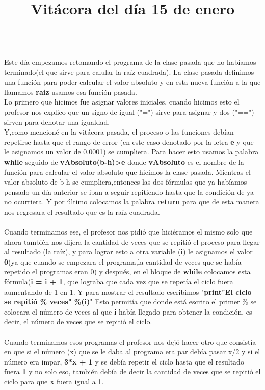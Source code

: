 \documentclass{article}
\begin{document}
	\title{\huge\textbf{Vitácora del día 15 de enero\\}} \\
	Este día empezamos retomando el programa de la clase pasada que no habíamos terminado(el que sirve para calular la raíz cuadrada). La clase pasada definimos una función para poder calcular el valor absoluto y en esta nueva función a la que llamamos \textbf{raiz} usamos esa función pasada. \\
	Lo primero que hicimos fue asignar valores iniciales, cuando hicimos esto el profesor nos explico que un signo de igual ("=") sirve para asignar y dos ("==") sirven para denotar una igualdad. \\
	Y,como mencioné en la vitácora pasada, el proceso o las funciones debían repetirse hasta que el rango de error (en este caso denotado por la letra \textbf{e} y que le asignamos un valor de 0.0001) se cumpliera. Para hacer esto usamos la palabra \textbf{while} seguido de \textbf{vAbsoluto(b-h)>e} donde \textbf{vAbsoluto} es el nombre de la función para calcular el valor absoluto que hicimos la clase pasada. Mientras el valor absoluto de b-h se cumpliera,entonces las dos fórmulas que ya habíamos pensado un día anterior se iban a seguir repitiendo hasta que la condición de ya no ocurriera. Y por último colocamos la palabra \textbf{return} para que de esta manera nos regresara el resultado que es la raíz cuadrada. \\ \\
	Cuando terminamos ese, el profesor nos pidió que hiciéramos el mismo solo que ahora también nos dijera la cantidad de veces que se repitió el proceso para llegar al resultado (la raíz), y para lograr esto a otra variable (\textbf{i}) le asignamos el valor \textbf{0}(ya que cuando se empezara el programa,la cantidad de veces que se había repetido el programas eran 0) y después, en el bloque de \textbf{while} colocamos esta fórmula(\textbf{i = i + 1}, que lograba que cada vez que se repetía el ciclo fuera aumentando de 1 en 1. Y para mostrar el resultado escribimos "\textbf{print"El ciclo se repitió \% veces" \%(i)}" Esto permitía que donde está escrito el primer \% se colocara el número de veces al que \textbf{i} había llegado para obtener la condición, es decir, el número de veces que se repitió el ciclo. \\ \\
	Cuando terminamos esos programas el profesor nos dejó hacer otro que consistía en que si el número (x) que se le daba al programa era par debía pasar x/2 y si el número era impar, \textbf{3*x + 1} y se debía repetir el ciclo hasta que el resultado fuera \textbf{1} y no solo eso, también debía de decir la cantidad de veces que se repitió el ciclo para que \textbf{x} fuera igual a 1. \\
\end{document}
